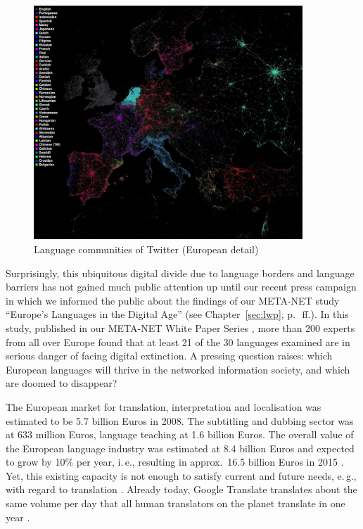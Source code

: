 \documentclass[10pt, plain]{../../metanetpaper}
\begin{document}
\begin{multicols}{2}
\begin{figure}[htb]
  \center
  \includegraphics[width=0.9\textwidth]{../_media/twitter-languages-europe}
  \caption{Language communities of Twitter (European detail)}
  \label{fig:european-languages-in-twitter}
\end{figure}

Surprisingly, this ubiquitous digital divide due to language borders and language barriers has not gained much public attention up until our recent press campaign in which we informed the public about the findings of our META-NET study ``Europe's Languages in the Digital Age'' (see Chapter~\ref{sec:lwp}, p.~\pageref{sec:lwp}\,ff.). In this study, published in our META-NET White Paper Series \cite{LWP2012}, more than 200 experts from all over Europe found that at least 21 of the 30 languages examined are in serious danger of facing digital extinction. A pressing question raises: which European languages will thrive in the networked information society, and which are doomed to disappear?

The European market for translation, interpretation and localisation was estimated to be 5.7 billion Euros in 2008. The subtitling and dubbing sector was at 633 million Euros, language teaching at 1.6 billion Euros. The overall value of the European language industry was estimated at 8.4 billion Euros and expected to grow by 10\% per year, i.\,e., resulting in approx.~16.5 billion Euros in 2015 \cite{EC3}. Yet, this existing capacity is not enough to satisfy current and future needs, e.\,g., with regard to translation \cite{csa2009}. Already today, Google Translate translates about the same volume per day that all human translators on the planet translate in one year \cite{och12}.


\end{multicols}
\end{document}
